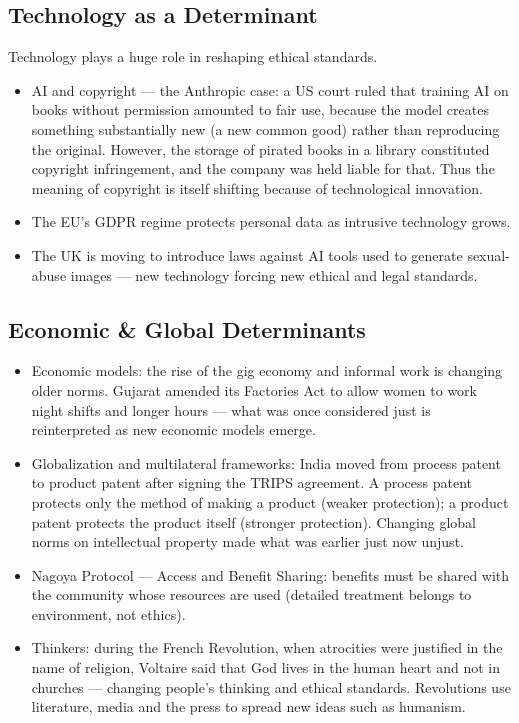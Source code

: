 \subsection{Technology as a Determinant}

Technology plays a huge role in reshaping ethical standards.

\begin{ExampleBox}
\begin{itemize}
\item AI and copyright --- the Anthropic case: a US court ruled that training AI on books without permission amounted to fair use, because the model creates something substantially new (a new common good) rather than reproducing the original. However, the storage of pirated books in a library constituted copyright infringement, and the company was held liable for that. Thus the meaning of copyright is itself shifting because of technological innovation.
\item The EU's GDPR regime protects personal data as intrusive technology grows.
\item The UK is moving to introduce laws against AI tools used to generate sexual-abuse images --- new technology forcing new ethical and legal standards.
\end{itemize}
\end{ExampleBox}

\subsection{Economic \& Global Determinants}

\begin{itemize}
\item Economic models: the rise of the gig economy and informal work is changing older norms. Gujarat amended its Factories Act to allow women to work night shifts and longer hours --- what was once considered just is reinterpreted as new economic models emerge.
\item Globalization and multilateral frameworks: India moved from process patent to product patent after signing the TRIPS agreement. A process patent protects only the method of making a product (weaker protection); a product patent protects the product itself (stronger protection). Changing global norms on intellectual property made what was earlier just now unjust.
\item Nagoya Protocol --- Access and Benefit Sharing: benefits must be shared with the community whose resources are used (detailed treatment belongs to environment, not ethics).
\item Thinkers: during the French Revolution, when atrocities were justified in the name of religion, Voltaire said that God lives in the human heart and not in churches --- changing people's thinking and ethical standards. Revolutions use literature, media and the press to spread new ideas such as humanism.
\end{itemize}


